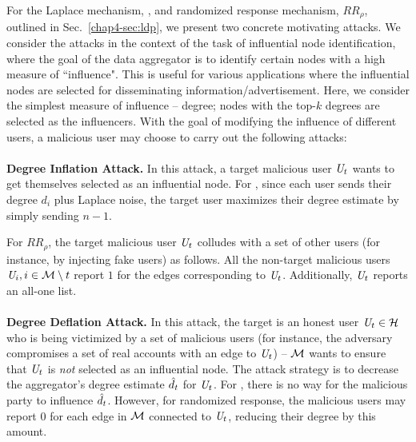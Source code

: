 For the Laplace mechanism, \RLap, and randomized response mechanism, $RR_\rho$,  outlined in Sec.~\ref{chap4-sec:ldp}, we present two concrete motivating attacks. We consider the attacks in the context of the task of influential node identification, where the goal of the data aggregator is to identify certain nodes with a high measure of ``influence". This is useful for various applications where the influential nodes are selected for disseminating information/advertisement. Here, we consider the simplest measure of influence -- degree; nodes with the top-$k$ degrees are selected as the influencers. With the goal of modifying the influence of different users, a malicious user may choose to carry out the following attacks:
    \\\\\noindent\textbf{Degree Inflation Attack.} In this attack, a target malicious user $\textit{U}_t$ wants to get themselves selected as an influential node. For \RLap, since each user sends their degree $d_i$ plus Laplace noise, the target user maximizes their degree estimate by simply sending $n-1$. 

For $RR_\rho$, the target malicious user $\textit{U}_t$ colludes with a set of other users  (for instance, by injecting fake users) as follows. All the non-target malicious users $\textit{U}_i, i \in \mathcal{M}\setminus t$ report $1$ for the edges corresponding to $\textit{U}_t$. Additionally, $\textit{U}_t$ reports an all-one list.     \\\\
\noindent\textbf{Degree Deflation Attack.}   In this attack, the target is an honest user $\textit{U}_t \in \mathcal{H}$ who is being victimized by a set of malicious users (for instance, the adversary compromises a set of real accounts with an edge to $\textit{U}_t$) -- $\mathcal{M}$ wants to ensure that $\textit{U}_t$ is \textit{not} selected as an influential node. The attack strategy is to decrease the aggregator's degree estimate $\hat{d}_t$ for $\textit{U}_t$. For \RLap, there is no way for the malicious party to influence $\hat{d}_t$. However, for randomized response, the malicious users may report $0$ for each edge in $\mathcal{M}$ connected to $\textit{U}_t$, reducing their degree by this amount. %
